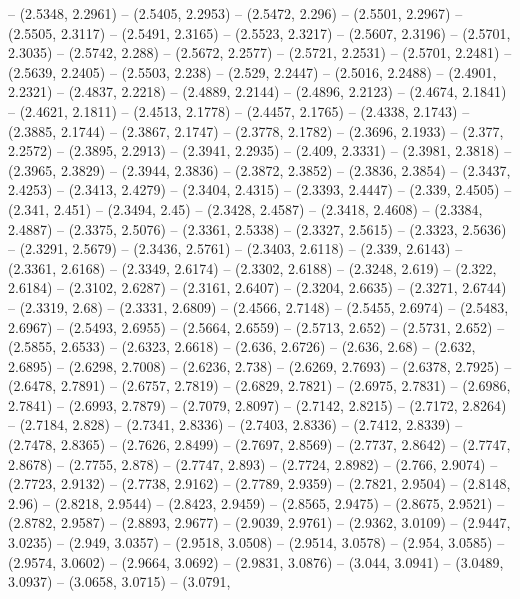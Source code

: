 {  -- (2.5348, 2.2961) -- (2.5405, 2.2953) -- (2.5472, 2.296) -- (2.5501, 2.2967)
   -- (2.5505, 2.3117) -- (2.5491, 2.3165) -- (2.5523, 2.3217) -- (2.5607, 
  2.3196) -- (2.5701, 2.3035) -- (2.5742, 2.288) -- (2.5672, 2.2577) -- (2.5721,
   2.2531) -- (2.5701, 2.2481) -- (2.5639, 2.2405) -- (2.5503, 2.238) -- (2.529,
   2.2447) -- (2.5016, 2.2488) -- (2.4901, 2.2321) -- (2.4837, 2.2218) -- 
  (2.4889, 2.2144) -- (2.4896, 2.2123) -- (2.4674, 2.1841) -- (2.4621, 2.1811) 
  -- (2.4513, 2.1778) -- (2.4457, 2.1765) -- (2.4338, 2.1743) -- (2.3885, 
  2.1744) -- (2.3867, 2.1747) -- (2.3778, 2.1782) -- (2.3696, 2.1933) -- (2.377,
   2.2572) -- (2.3895, 2.2913) -- (2.3941, 2.2935) -- (2.409, 2.3331) -- 
  (2.3981, 2.3818) -- (2.3965, 2.3829) -- (2.3944, 2.3836) -- (2.3872, 2.3852) 
  -- (2.3836, 2.3854) -- (2.3437, 2.4253) -- (2.3413, 2.4279) -- (2.3404, 
  2.4315) -- (2.3393, 2.4447) -- (2.339, 2.4505) -- (2.341, 2.451) -- (2.3494, 
  2.45) -- (2.3428, 2.4587) -- (2.3418, 2.4608) -- (2.3384, 2.4887) -- (2.3375, 
  2.5076) -- (2.3361, 2.5338) -- (2.3327, 2.5615) -- (2.3323, 2.5636) -- 
  (2.3291, 2.5679) -- (2.3436, 2.5761) -- (2.3403, 2.6118) -- (2.339, 2.6143) --
   (2.3361, 2.6168) -- (2.3349, 2.6174) -- (2.3302, 2.6188) -- (2.3248, 2.619) 
  -- (2.322, 2.6184) -- (2.3102, 2.6287) -- (2.3161, 2.6407) -- (2.3204, 2.6635)
   -- (2.3271, 2.6744) -- (2.3319, 2.68) -- (2.3331, 2.6809) -- (2.4566, 2.7148)
   -- (2.5455, 2.6974) -- (2.5483, 2.6967) -- (2.5493, 2.6955) -- (2.5664, 
  2.6559) -- (2.5713, 2.652) -- (2.5731, 2.652) -- (2.5855, 2.6533) -- (2.6323, 
  2.6618) -- (2.636, 2.6726) -- (2.636, 2.68) -- (2.632, 2.6895) -- (2.6298, 
  2.7008) -- (2.6236, 2.738) -- (2.6269, 2.7693) -- (2.6378, 2.7925) -- (2.6478,
   2.7891) -- (2.6757, 2.7819) -- (2.6829, 2.7821) -- (2.6975, 2.7831) -- 
  (2.6986, 2.7841) -- (2.6993, 2.7879) -- (2.7079, 2.8097) -- (2.7142, 2.8215) 
  -- (2.7172, 2.8264) -- (2.7184, 2.828) -- (2.7341, 2.8336) -- (2.7403, 2.8336)
   -- (2.7412, 2.8339) -- (2.7478, 2.8365) -- (2.7626, 2.8499) -- (2.7697, 
  2.8569) -- (2.7737, 2.8642) -- (2.7747, 2.8678) -- (2.7755, 2.878) -- (2.7747,
   2.893) -- (2.7724, 2.8982) -- (2.766, 2.9074) -- (2.7723, 2.9132) -- (2.7738,
   2.9162) -- (2.7789, 2.9359) -- (2.7821, 2.9504) -- (2.8148, 2.96) -- (2.8218,
   2.9544) -- (2.8423, 2.9459) -- (2.8565, 2.9475) -- (2.8675, 2.9521) -- 
  (2.8782, 2.9587) -- (2.8893, 2.9677) -- (2.9039, 2.9761) -- (2.9362, 3.0109) 
  -- (2.9447, 3.0235) -- (2.949, 3.0357) -- (2.9518, 3.0508) -- (2.9514, 3.0578)
   -- (2.954, 3.0585) -- (2.9574, 3.0602) -- (2.9664, 3.0692) -- (2.9831, 
  3.0876) -- (3.044, 3.0941) -- (3.0489, 3.0937) -- (3.0658, 3.0715) -- (3.0791,
}
